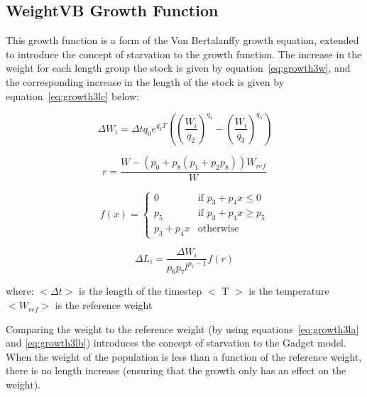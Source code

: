 \documentclass [a4paper, 10pt]{book}
\begin{document}
\subsection{WeightVB Growth Function}\label{subsec:growth3}
This growth function is a form of the Von Bertalanffy growth equation, extended to introduce the concept of starvation to the growth function.  The increase in the weight for each length group the stock is given by equation~\ref{eq:growth3w}, and the corresponding increase in the length of the stock is given by equation~\ref{eq:growth3lc} below:

\begin{equation}\label{eq:growth3w}
\Delta W_{i} = \Delta t q_{0} e^{q_{1} T}\left(
\left( \frac{W_{i}}{q_{2}} \right)^{q_{4}} -
\left( \frac{W_{i}}{q_{3}} \right)^{q_{5}} \right)
\end{equation}

\begin{equation}\label{eq:growth3la}
 r = \frac{W - \left( p_{0} + p_{8} \left( p_{1} + p_{2}p_{8} \right) \right) W_{ref}}{W}
\end{equation}

\begin{equation}\label{eq:growth3lb}
f(x) =
\begin{cases}
  0
  & \textrm{if $p_{3} + p_{4}x \leq 0$} \\
  p_{5}
  & \textrm{if $p_{3} + p_{4}x \geq p_{5}$} \\
  p_{3} + p_{4}x
  & \textrm{otherwise}
\end{cases}
\end{equation}

\begin{equation}\label{eq:growth3lc}
\Delta L_{i} = \frac{\Delta W_{i}} {p_{6} p_{7} l^{p_{7} - 1}} f(r)
\end{equation}

where:\newline
$<\Delta t>$ is the length of the timestep\newline
$<$ T $>$ is the temperature\newline
$<W_{ref}>$ is the reference weight

\bigskip
Comparing the weight to the reference weight (by using equations~\ref{eq:growth3la} and \ref{eq:growth3lb}) introduces the concept of starvation to the Gadget model.  When the weight of the population is less than a function of the reference weight, there is no length increase (ensuring that the growth only has an effect on the weight).
\end{document}
